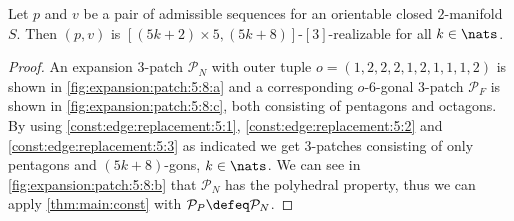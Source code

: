 \clearpage
\begin{theorem}
  Let $p$ and $v$ be a pair of admissible sequences for an orientable closed $2$-manifold $S$. Then $(p, v)$ is $[(5k + 2) \times 5, (5k+8)]$-$[3]$-realizable for all $k \in \nats$.
  \begin{proof}
    An expansion $3$-patch $\mathcal{P}_N$ with outer tuple $o = (1, 2, 2, 2, 1, 2, 1, 1, 1, 2)$ is shown in \autoref{fig:expansion:patch:5:8:a} and a corresponding $o$-$6$-gonal $3$-patch $\mathcal{P}_F$ is shown in \autoref{fig:expansion:patch:5:8:c}, both consisting of pentagons and octagons. By using \autoref{const:edge:replacement:5:1}, \autoref{const:edge:replacement:5:2} and \autoref{const:edge:replacement:5:3} as indicated we get $3$-patches consisting of only pentagons and $(5k+8)$-gons, $k \in \nats$. We can see in \autoref{fig:expansion:patch:5:8:b} that $\mathcal{P}_N$ has the polyhedral property, thus we can apply \autoref{thm:main:const} with $\mathcal{P}_P \defeq \mathcal{P}_N$.
  \end{proof}
\end{theorem}%
